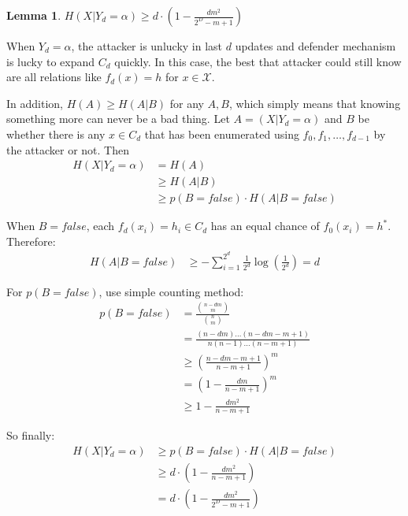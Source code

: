 \documentclass[10pt, conference, compsocconf]{IEEEtran}
\newtheorem{mylemma}{Lemma}
\begin{document}
		\begin{mylemma}\label{lem1}
			$H(X|Y_d = \alpha) \geq d \cdot (1-\frac{dm^2}{2^D-m+1})$
		\end{mylemma}
		
		\begin{IEEEproof}
			When $Y_d = \alpha$, the attacker
			is unlucky in last $d$ updates
			and defender mechanism is lucky
			to expand $C_d$ quickly.
			In this case, the best that attacker
			could still know are all relations
			like $f_d(x) = h$ for $x \in \mathcal X$.
			
			In addition, $H(A) \geq H(A|B)$ for
			any $A, B$, which simply means that knowing something
			more can never be a bad thing. Let $A = (X | Y_d = \alpha)$
			and $B$ be whether there is any $x \in C_d$ that
			has been enumerated using $f_0, f_1, \ldots, f_{d-1}$ 
			by the attacker or not.
			Then
			\begin{align*}
				H(X | Y_d = \alpha) &= H(A)\\
					&\geq H(A | B)\\
					&\geq p(B = false) \cdot H(A | B = false)
			\end{align*}
			
			When $B = false$, each $f_d(x_i) = h_i \in C_d$
			has an equal chance of $f_0(x_i) = h^*$. Therefore:
			\begin{align*}
				H(A | B = false) &\geq -\sum_{i = 1}^{2^d} \frac{1}{2^d} \log(\frac{1}{2^d})
					= d
			\end{align*}
			
			For $p(B = false)$, use simple counting method:
			\begin{align*}
				p(B = false) &= \frac{\binom{n-dm}{m}}{\binom{n}{m}}\\
					&= \frac{(n-dm)\ldots(n-dm-m+1)}{n(n-1)\ldots(n-m+1)}\\
					&\geq (\frac{n-dm-m+1}{n-m+1})^m\\
					&= (1-\frac{dm}{n-m+1})^m\\
					&\geq 1-\frac{dm^2}{n-m+1}
			\end{align*}
			
			So finally:
			\begin{align*}
				H(X | Y_d = \alpha) &\geq p(B = false) \cdot H(A | B = false)\\
					&\geq d \cdot (1-\frac{dm^2}{n-m+1})\\
					&= d \cdot (1-\frac{dm^2}{2^D-m+1})
			\end{align*}
		\end{IEEEproof}
		
\end{document}
